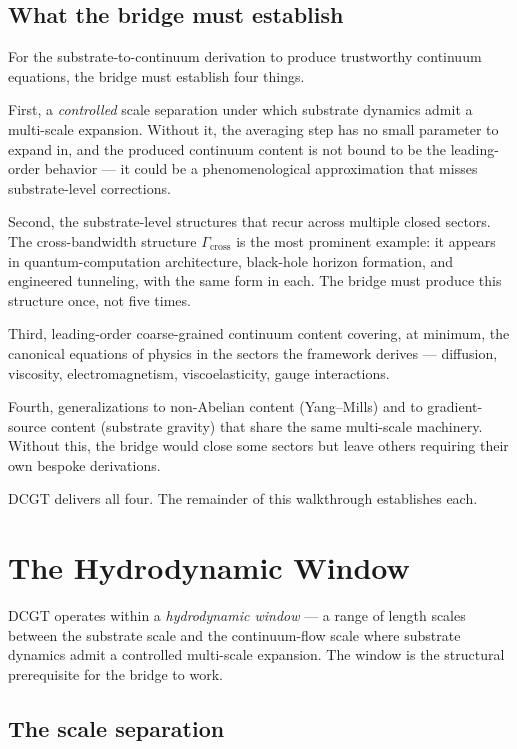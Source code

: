 \documentclass[11pt,a4paper]{article}
\begin{document}
\subsection{What the bridge must establish}

For the substrate-to-continuum derivation to produce trustworthy continuum equations, the bridge must establish four things.

First, a \emph{controlled} scale separation under which substrate dynamics admit a multi-scale expansion. Without it, the averaging step has no small parameter to expand in, and the produced continuum content is not bound to be the leading-order behavior --- it could be a phenomenological approximation that misses substrate-level corrections.

Second, the substrate-level structures that recur across multiple closed sectors. The cross-bandwidth structure $\Gamma_{\mathrm{cross}}$ is the most prominent example: it appears in quantum-computation architecture, black-hole horizon formation, and engineered tunneling, with the same form in each. The bridge must produce this structure once, not five times.

Third, leading-order coarse-grained continuum content covering, at minimum, the canonical equations of physics in the sectors the framework derives --- diffusion, viscosity, electromagnetism, viscoelasticity, gauge interactions.

Fourth, generalizations to non-Abelian content (Yang--Mills) and to gradient-source content (substrate gravity) that share the same multi-scale machinery. Without this, the bridge would close some sectors but leave others requiring their own bespoke derivations.

DCGT delivers all four. The remainder of this walkthrough establishes each.

\section{The Hydrodynamic Window}

DCGT operates within a \emph{hydrodynamic window} --- a range of length scales between the substrate scale and the continuum-flow scale where substrate dynamics admit a controlled multi-scale expansion. The window is the structural prerequisite for the bridge to work.

\subsection{The scale separation}
\end{document}
